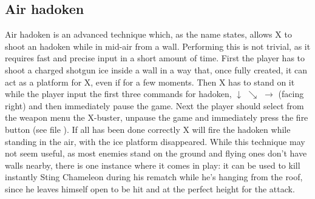 \subsection{Air hadoken}
Air hadoken is an advanced technique which, as the name states, allows X to shoot an hadoken while in mid-air from a wall. Performing this is not trivial, as it requires fast and precise input in a short amount of time. First the player has to shoot a charged shotgun ice inside a wall in a way that, once fully created, it can act as a platform for X, even if for a few moments. Then X has to stand on it while the player input the first three commands for hadoken, $\downarrow$ $\searrow$ $\rightarrow$ (facing right) and then immediately pause the game. Next the player should select from the weapon menu the X-buster, unpause the game and immediately press the fire button (see file ). If all has been done correctly X will fire the hadoken while standing in the air, with the ice platform disappeared. While this technique may not seem useful, as most enemies stand on the ground and flying ones don't have walls nearby, there is one instance where it comes in play: it can be used to kill instantly Sting Chameleon during his rematch while he's hanging from the roof, since he leaves himself open to be hit and at the perfect height for the attack.

